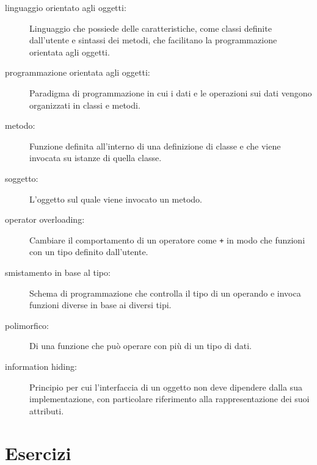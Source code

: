 \documentclass[10pt]{book}
\begin{document}
\begin{description}

\item[linguaggio orientato agli oggetti:] Linguaggio che possiede delle caratteristiche, come classi definite dall'utente e sintassi dei metodi, che facilitano la programmazione orientata agli oggetti. 

\item[programmazione orientata agli oggetti:] Paradigma di programmazione in cui i dati e le operazioni sui dati vengono organizzati in classi e metodi.

\item[metodo:] Funzione definita all'interno di una definizione di classe e che viene invocata su istanze di quella classe.

\item[soggetto:] L'oggetto sul quale viene invocato un metodo.

\item[operator overloading:] Cambiare il comportamento di un operatore come
{\tt +} in modo che funzioni con un tipo definito dall'utente.

\item[smistamento in base al tipo:] Schema di programmazione che controlla il tipo di un operando e invoca funzioni diverse in base ai diversi tipi.

\item[polimorfico:] Di una funzione che può operare con più di un tipo di dati.

\item[information hiding:] Principio per cui l'interfaccia di un oggetto non deve dipendere dalla sua implementazione, con particolare riferimento alla rappresentazione dei suoi attributi.


\end{description}

\section{Esercizi}
\end{document}

